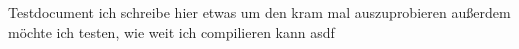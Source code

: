 \documentclass[11pt]{article}
\begin{document}
    Testdocument ich schreibe hier etwas um den kram mal auszuprobieren
    außerdem möchte ich testen, wie weit ich compilieren kann
    \newpage
    \newpage
    asdf
\end{document}
